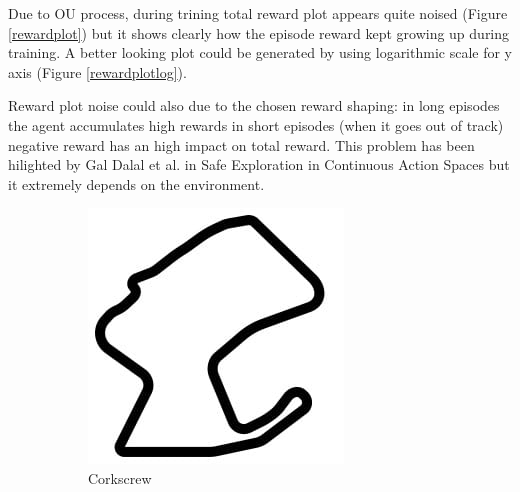\documentclass[Lau,oneside,noexaminfo]{sapthesis} %
\begin{document}
Due to OU process, during trining total reward plot appears quite noised (Figure \ref{rewardplot}) but it shows clearly how the episode reward kept growing up during training. A better looking plot could be generated by using logarithmic scale for y axis (Figure \ref{rewardplotlog}).

Reward plot noise could also due to the chosen reward shaping: in long episodes the agent accumulates high rewards in short episodes (when it goes out of track) negative reward has an high impact on total reward. This problem has been hilighted by Gal Dalal et al. in Safe Exploration in Continuous Action Spaces \cite{SAFEEXPLORATION} but it extremely depends on the environment.

\begin{figure}[H]
\centering
\begin{subfigure}{.20\textwidth}
  \centering
  \includegraphics[width=.9\linewidth]{corkscrew}
  \caption{Corkscrew}
  \label{corkscrew}
\end{subfigure}%
\begin{subfigure}{.20\textwidth}
  \centering

\end{subfigure}
\end{figure}
\end{document}
